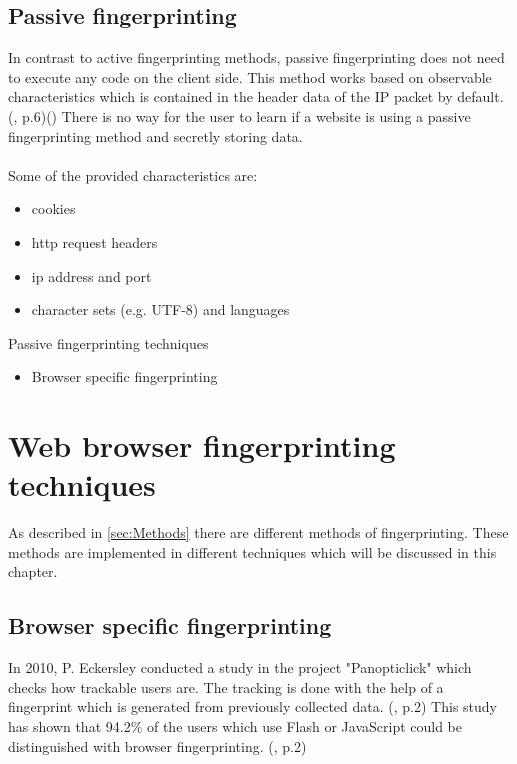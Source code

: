 \subsection{Passive fingerprinting}
In contrast to active fingerprinting methods, passive fingerprinting does not need to execute any code on the client side. This method works based on observable characteristics which is contained in the header data of the IP packet by default. (\textcite{doty18}, p.6)(\textcite{web17}) There is no way for the user to learn if a website is using a passive fingerprinting method and secretly storing data.\\\\
Some of the provided characteristics are:
\begin{itemize}
	\item cookies
	\item http request headers
	\item ip address and port
	\item character sets (e.g. UTF-8) and languages\\
\end{itemize}
Passive fingerprinting techniques
\begin{itemize}
	\item Browser specific fingerprinting
\end{itemize}

\section{Web browser fingerprinting techniques}

As described in \autoref{sec:Methods} there are different methods of fingerprinting. These methods are implemented in different techniques which will be discussed in this chapter.
\subsection{Browser specific fingerprinting}
In 2010, P. Eckersley conducted a study in the project "Panopticlick" which checks how trackable users are. The tracking is done with the help of a fingerprint which is generated from previously collected data. (\textcite{upi15}, p.2) This study has shown that 94.2\% of the users which use Flash or JavaScript could be distinguished with browser fingerprinting. (\textcite{eckersley10}, p.2)

